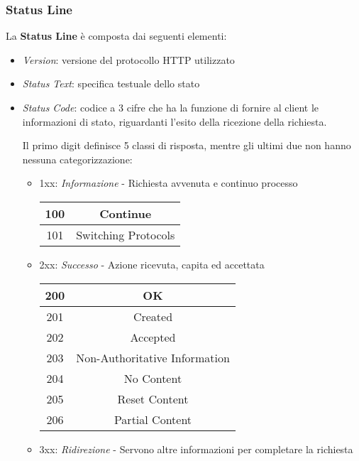 \documentclass[a4paper,11pt]{article}
\begin{document}
\subsubsection{Status Line}
La \textbf{Status Line} è composta dai seguenti elementi:
\begin{itemize}
    \item \textit{Version}: versione del protocollo HTTP utilizzato
    \item \textit{Status Text}: specifica testuale dello stato 
    \item \textit{Status Code}: codice a 3 cifre che ha la funzione di fornire al client le informazioni di stato, riguardanti l'esito della ricezione della richiesta.\par
    Il primo digit definisce 5 classi di risposta, mentre gli ultimi due non hanno nessuna categorizzazione:
    \begin{itemize}
        \item 1xx: \textit{Informazione} - Richiesta avvenuta e continuo processo
        \begin{center}
            \begin{tabular}{c|c}
                100 & Continue\\
                \hline
                101 & Switching Protocols\\
            \end{tabular}
        \end{center}
        \item 2xx: \textit{Successo} - Azione ricevuta, capita ed accettata
        \begin{center}
            \begin{tabular}{c|c}
                200 & OK\\
                \hline
                201 & Created\\
                \hline
                202 & Accepted\\
                \hline
                203 & Non-Authoritative Information\\
                \hline
                204 & No Content\\
                \hline
                205 & Reset Content\\
                \hline
                206 & Partial Content\\
            \end{tabular}
        \end{center}
        \item 3xx: \textit{Ridirezione} - Servono altre informazioni per completare la richiesta

\end{itemize}
\end{itemize}
\end{document}
